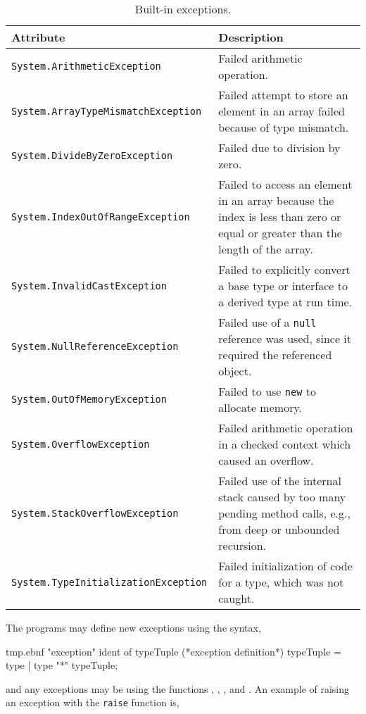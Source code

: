 \begin{table}
  \centering
  \begin{tabularx}{\linewidth}{|l|X|}
    \hline
    \rowcolor{headerRowColor} Attribute & Description\\
    \hline
    \lstinline!System.ArithmeticException! & Failed arithmetic operation.\\
   \hline
    \lstinline!System.ArrayTypeMismatchException! & Failed attempt to store an element in an array failed because of type mismatch.\\
   \hline
    \lstinline!System.DivideByZeroException! & Failed due to division by zero.\\
   \hline
    \lstinline!System.IndexOutOfRangeException! & Failed to access an element in an array because the index is less than zero or equal or greater than the length of the array.\\
   \hline
    \lstinline!System.InvalidCastException! & Failed to explicitly convert a base type or interface to a derived type at run time.\\
   \hline
    \lstinline!System.NullReferenceException! & Failed use of a \lstinline!null! reference was used, since it required the referenced object.\\
   \hline
    \lstinline!System.OutOfMemoryException! & Failed to use \lstinline!new! to allocate memory.\\ 
   \hline
    \lstinline!System.OverflowException! & Failed arithmetic operation in a checked context which caused an overflow.\\
   \hline
    \lstinline!System.StackOverflowException ! & Failed use of the internal stack caused by too many pending method calls, e.g., from deep or unbounded recursion.\\
   \hline
    \lstinline!System.TypeInitializationException! & Failed initialization of code for a type, which was not caught.\\
   \hline
  \end{tabularx}
  \caption{Built-in exceptions.}
  \label{tab:exceptions}
\end{table}
The programs may define new exceptions using the syntax,
%
\begin{verbatimwrite}{tmp.ebnf}
"exception" ident of typeTuple (*exception definition*)
typeTuple = type | type "*" typeTuple;
\end{verbatimwrite}
%
and any exceptions may be  using the functions , , , and . An example of raising an exception with the \lstinline!raise! function is,
